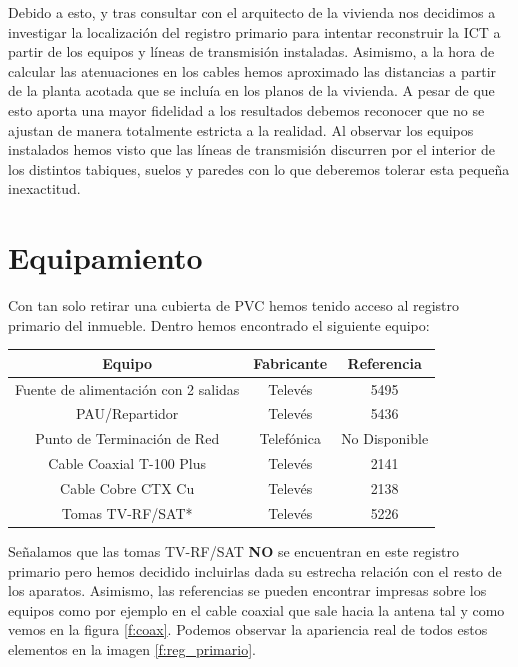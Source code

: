 \documentclass{article}[12 pt]
\begin{document}
		Debido a esto, y tras consultar con el arquitecto de la vivienda nos decidimos a investigar la localización del registro primario para intentar reconstruir la ICT a partir de los equipos y líneas de transmisión instaladas. Asimismo, a la hora de calcular las atenuaciones en los cables hemos aproximado las distancias a partir de la planta acotada que se incluía en los planos de la vivienda. A pesar de que esto aporta una mayor fidelidad a los resultados debemos reconocer que no se ajustan de manera totalmente estricta a la realidad. Al observar los equipos instalados hemos visto que las líneas de transmisión discurren por el interior de los distintos tabiques, suelos y paredes con lo que deberemos tolerar esta pequeña inexactitud.

	\section{Equipamiento}
		Con tan solo retirar una cubierta de PVC hemos tenido acceso al registro primario del inmueble. Dentro hemos encontrado el siguiente equipo:

		\vskip 3mm

		\begin{center}
			\begin{tabular}{| c | c | c |}
				\hline
				\textbf{Equipo} & \textbf{Fabricante} & \textbf{Referencia}\\
				\hline
				Fuente de alimentación con 2 salidas & Televés & 5495\\
				\hline
				PAU/Repartidor & Televés & 5436\\
				\hline
				Punto de Terminación de Red & Telefónica & No Disponible\\
				\hline
				Cable Coaxial T-100 Plus & Televés & 2141\\
				\hline
				Cable Cobre CTX Cu & Televés & 2138\\
				\hline
				Tomas TV-RF/SAT* & Televés & 5226\\
				\hline
			\end{tabular}
		\end{center}

		\vskip 3mm

		Señalamos que las tomas TV-RF/SAT \textbf{NO} se encuentran en este registro primario pero hemos decidido incluirlas dada su estrecha relación con el resto de los aparatos. Asimismo, las referencias se pueden encontrar impresas sobre los equipos como por ejemplo en el cable coaxial que sale hacia la antena tal y como vemos en la figura \ref{f:coax}. Podemos observar la apariencia real de todos estos elementos en la imagen \ref{f:reg_primario}.
\end{document}
